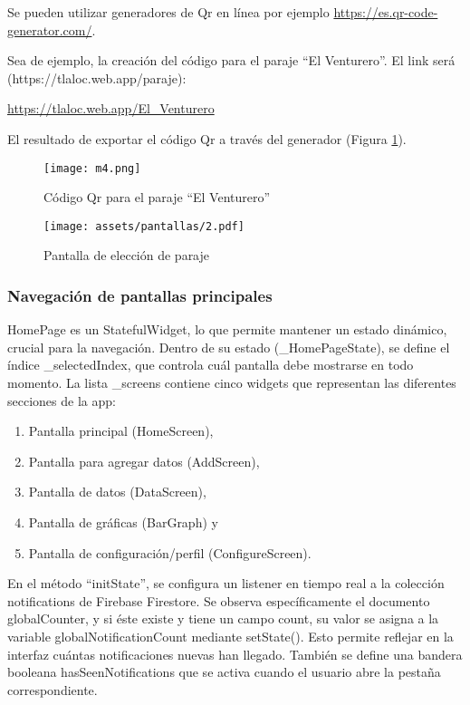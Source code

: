 Se pueden utilizar generadores de Qr en línea por ejemplo \url{https://es.qr-code-generator.com/}.

  Sea de ejemplo, la creación del código para el paraje ``El Venturero''. El link será (https://tlaloc.web.app/paraje):
  \begin{center}
    \url{https://tlaloc.web.app/El_Venturero}
  \end{center}
  El resultado de exportar el código Qr a través del generador (Figura \ref{m4}).
  \begin{figure}[h!]
  \centering
    \texttt{[image: m4.png]}
    \caption{Código Qr para el paraje ``El Venturero''}
    \label{m4}
  \end{figure} 


\begin{figure}[h!]
\centering
  \texttt{[image: assets/pantallas/2.pdf]}
  \caption{Pantalla de elección de paraje}
  \label{pantallas3}
\end{figure}
\newpage




\newpage
\subsubsection*{Navegación de pantallas principales}

HomePage es un StatefulWidget, lo que permite mantener un estado dinámico, crucial para la navegación. Dentro de su estado (\_HomePageState), se define el índice \_selectedIndex, que controla cuál pantalla debe mostrarse en todo momento. La lista \_screens contiene cinco widgets que representan las diferentes secciones de la app: 
\begin{enumerate}
  \item Pantalla principal (HomeScreen),
  \item Pantalla para agregar datos (AddScreen),
  \item Pantalla de datos (DataScreen), 
  \item Pantalla de gráficas (BarGraph) y
  \item Pantalla de configuración/perfil (ConfigureScreen).
\end{enumerate}

En el método ``initState'', se configura un listener en tiempo real a la colección notifications de Firebase Firestore. Se observa específicamente el documento globalCounter, y si éste existe y tiene un campo count, su valor se asigna a la variable globalNotificationCount mediante setState(). Esto permite reflejar en la interfaz cuántas notificaciones nuevas han llegado. También se define una bandera booleana hasSeenNotifications que se activa cuando el usuario abre la pestaña correspondiente.

